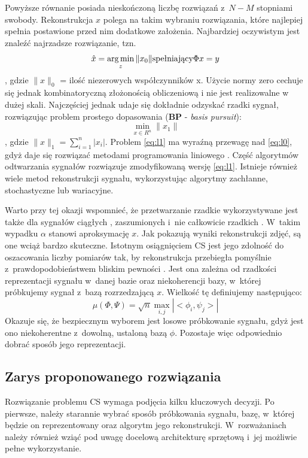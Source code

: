 Powyższe równanie posiada nieskończoną liczbę rozwiązań z~$N - M$ stopniami swobody. Rekonstrukcja $x$ polega na takim wybraniu rozwiązania, które najlepiej spełnia postawione przed nim dodatkowe założenia. Najbardziej oczywistym jest znaleźć najrzadsze rozwiązanie, tzn.
\begin{equation}
	\hat{x} = \operatorname*{arg\,min}_z \|x_0\| \text{spełniający} \Phi x=y
	\label{eq:l0}
\end{equation} \cite{CandesIntro, Davenport2010, Zhang2013}, gdzie $\|x\|_0$ = ilość niezerowych współczynników x. Użycie normy zero cechuje się jednak kombinatoryczną złożonością obliczeniową i nie jest realizowalne w dużej skali. Najczęściej jednak udaje się dokładnie odzyskać rzadki sygnał, rozwiązując problem prostego dopasowania (\textbf{BP} - \textit{basis pursuit}):
\begin{equation}
\min_{x \in R^n} \|x_1\| 
\label{eq:l1}
\end{equation}, gdzie $\|x\|_1 = \sum_{i=1}^{n} |x_i|$. Problem \ref{eq:l1} ma wyraźną przewagę nad \ref{eq:l0}, gdyż daje się rozwiązać metodami programowania liniowego \cite{Fountoulakis2012}. Część algorytmów odtwarzania sygnałów rozwiązuje zmodyfikowaną wersję \ref{eq:l1}. Istnieje również wiele metod rekonstrukcji sygnału, wykorzystując algorytmy zachłanne, stochastyczne lub wariacyjne.
 
Warto przy tej okazji wspomnieć, że przetwarzanie rzadkie wykorzystywane jest także dla sygnałów ciągłych \cite{Eldar2009}, zaszumionych i~nie całkowicie rzadkich \cite{Cevher2009}. W~takim wypadku $\alpha$ stanowi aproksymację $x$. Jak pokazują wyniki rekonstrukcji zdjęć, są one wciąż bardzo skuteczne. 
\newline{}
Istotnym osiągnięciem CS jest jego zdolność do oszacowania liczby pomiarów tak, by rekonstrukcja przebiegła pomyślnie z~prawdopodobieństwem bliskim pewności \cite{CandesIntro}. Jest ona zależna od rzadkości reprezentacji sygnału w~danej bazie oraz niekoherencji bazy, w~której próbkujemy sygnał z~bazą rozrzedzającą $x$. Wielkość tę definiujemy następująco:
\begin{equation}
	\mu (\Phi,\Psi) = \sqrt{n} \max_{i, j} |<\phi_i, \psi_j>|
	\label{eq:coherence}
\end{equation}
Okazuje się, że bezpiecznym wyborem jest losowe próbkowanie sygnału, gdyż jest ono niekoherentne z~dowolną, ustaloną bazą $\phi$. Pozostaje więc odpowiednio dobrać sposób jego reprezentacji.

\subsection{Zarys proponowanego rozwiązania}
Rozwiązanie problemu CS wymaga podjęcia kilku kluczowych decyzji. Po pierwsze, należy starannie wybrać sposób próbkowania sygnału, bazę, w~której będzie on reprezentowany oraz algorytm jego rekonstrukcji. W~rozważaniach należy również wziąć pod uwagę docelową architekturę sprzętową i~jej możliwie pełne wykorzystanie.

